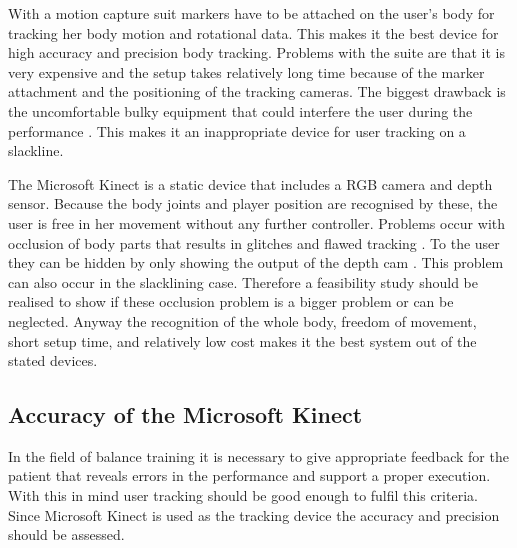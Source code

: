 With a motion capture suit markers have to be attached on the user’s body for tracking her body motion and rotational data. This makes it the best device for high accuracy and precision body tracking. Problems with the suite are that it is very expensive and the setup takes relatively long time because of the marker attachment and the positioning of the tracking cameras. The biggest drawback is the uncomfortable bulky equipment that could interfere the user during the performance \cite{Bogdanovych2015-ci} \cite{Chang2012-hz} \cite{Nusman2006-rf}. This makes it an inappropriate device for user tracking on a slackline.

The Microsoft Kinect is a static device that includes a RGB camera and depth sensor. Because the body joints and player position are recognised by these, the user is free in her movement without any further controller. Problems occur with occlusion of body parts that results in glitches and flawed tracking \cite{Kajastila2014-ug} \cite{Tang2015-wt}. To the user they can be hidden by only showing the output of the depth cam \cite{Holsti2013-kn}. This problem can also occur in the slacklining case. Therefore a feasibility study should be realised to show if these occlusion problem is a bigger problem or can be neglected. Anyway the recognition of the whole body, freedom of movement, short setup time, and relatively low cost makes it the best system out of the stated devices.

\subsection{Accuracy of the Microsoft Kinect}

In the field of balance training it is necessary to give appropriate feedback for the patient that reveals errors in the performance and support a proper execution. With this in mind user tracking should be good enough to fulfil this criteria. Since Microsoft Kinect is used as the tracking device the accuracy and precision should be assessed.

